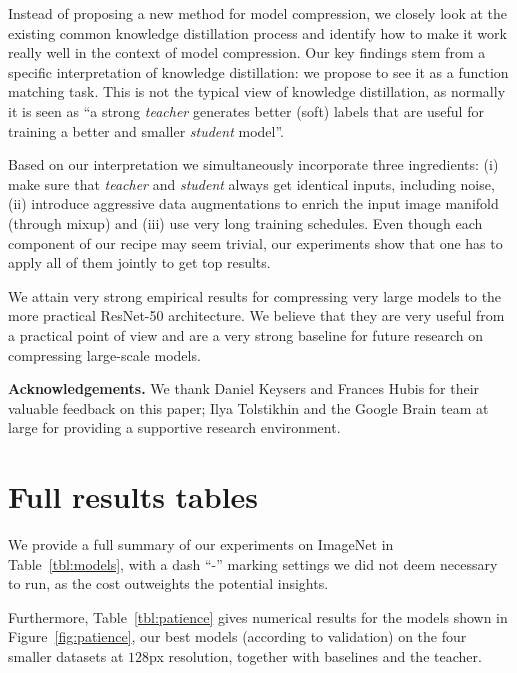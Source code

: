 \documentclass[10pt,twocolumn,letterpaper]{article}
\begin{document}
Instead of proposing a new method for model compression, we closely look at the existing common knowledge distillation process and identify how to make it work really well in the context of model compression. Our key findings stem from a specific interpretation of knowledge distillation: we propose to see it as a function matching task. This is not the typical view of knowledge distillation, as normally it is seen as ``a strong \emph{teacher} generates better (soft) labels that are useful for training a better and smaller \emph{student} model''.

Based on our interpretation we simultaneously incorporate three ingredients:  (i) make sure  that \emph{teacher} and \emph{student} always get identical inputs, including noise, (ii) introduce aggressive data augmentations to enrich the input image manifold (through mixup) and (iii) use very long training schedules. Even though each component of our recipe may seem trivial, our experiments show that one has to apply all of them jointly to get top results.

We attain very strong empirical results for compressing very large models to the more practical ResNet-50 architecture. We believe that they are very useful from a practical point of view and are a very strong baseline for future research on compressing large-scale models.

\textbf{Acknowledgements.} We thank Daniel Keysers and Frances Hubis for their valuable feedback on
this paper; Ilya Tolstikhin and the Google Brain team at large for providing a supportive research environment.

{\small


}

\clearpage{}
\appendix

\section{Full results tables}\label{sec:app:table}

We provide a full summary of our experiments on ImageNet in Table~\ref{tbl:models}, with a dash ``-'' marking settings we did not deem necessary to run, as the cost outweights the potential insights.

Furthermore, Table~\ref{tbl:patience} gives numerical results for the models shown in Figure~\ref{fig:patience}, our best models (according to validation) on the four smaller datasets at $128$px resolution, together with baselines and the teacher.
\end{document}
